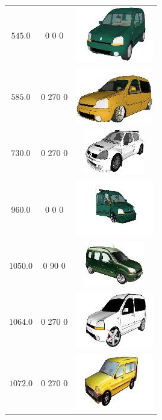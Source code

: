 \begin{longtable}{ccc}
	$545.0$ & 0 0 0 & \includegraphics{models/af9d95bf8619c8ed35a40a719029d19.jpg}\\
	$585.0$ & 0 270 0 & \includegraphics{models/11e7d5280efb61183ec88fcb196b59fe.jpg}\\
	$730.0$ & 0 270 0 & \includegraphics{models/30e971ea6fceac68f5cb3ca022cf045c.jpg}\\
	$960.0$ & 0 0 0 & \includegraphics{models/23e8bfa817f81ab448f562dc47c2f557.jpg}\\
	$1050.0$ & 0 90 0 & \includegraphics{models/42e7ca29c3f58a7668f78fafaaa936eb.jpg}\\
	$1064.0$ & 0 270 0 & \includegraphics{models/d0bfbe27a484a595fedc706b84ec9c4e.jpg}\\
	$1072.0$ & 0 270 0 & \includegraphics{models/3a19b2a95205c5eaf20831410ed8dba6.jpg}\\

\end{longtable}
